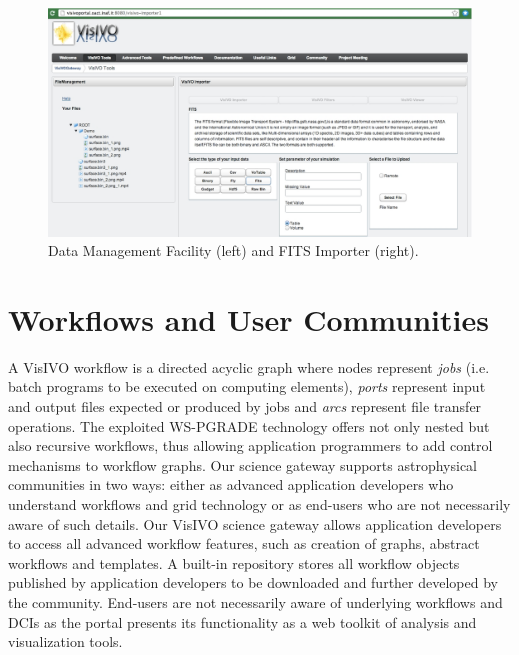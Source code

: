 \begin{figure}
\begin{center}
\includegraphics[width=1\textwidth]{part5/Costa_O08/O08_f1.eps} 
\caption{Data Management Facility (left) and FITS Importer (right).}\label{fg1}
\end{center}
\end{figure}

\section{Workflows and User Communities}
A VisIVO workflow is a directed acyclic graph where nodes represent \emph{jobs} (i.e. batch programs to be executed on computing elements),  \emph{ports} represent input and output files expected or produced by jobs and \emph{arcs} represent file transfer operations. The exploited WS-PGRADE technology offers not only nested but also recursive workflows, thus allowing application programmers to add control mechanisms to workflow graphs. Our science gateway supports astrophysical communities in two ways: either as advanced application developers who understand workflows and grid technology or as end-users who are not necessarily aware of such details. Our VisIVO science gateway allows application developers to access all advanced workflow features, such as creation of graphs, abstract workflows and templates. A built-in repository stores all workflow objects published by application developers to be downloaded and further developed by the community. End-users are not necessarily aware of underlying workflows and DCIs as the portal presents its functionality as a web toolkit of analysis and visualization tools. 

